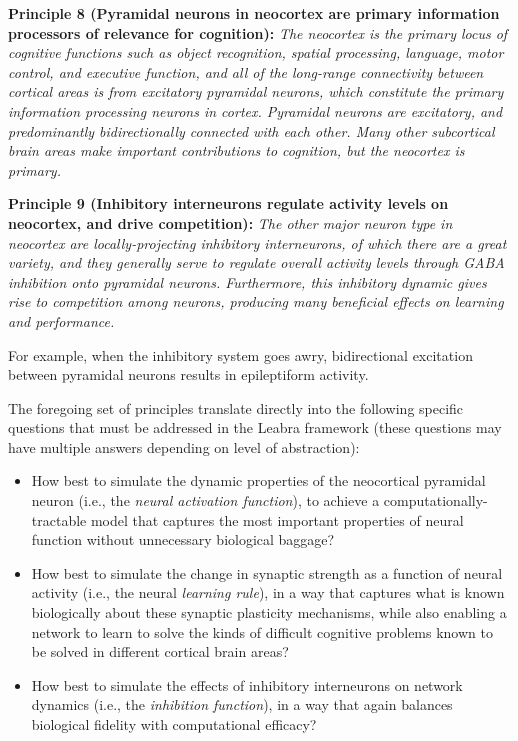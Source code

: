 \documentclass[11pt,twoside]{article}
\begin{document}
{\bf Principle 8 (Pyramidal neurons in neocortex are primary information processors of relevance for cognition):} {\em The neocortex is the primary locus of cognitive functions such as object recognition, spatial processing, language, motor control, and executive function, and all of the long-range connectivity between cortical areas is from excitatory pyramidal neurons, which constitute the primary information processing neurons in cortex.  Pyramidal neurons are excitatory, and predominantly bidirectionally connected with each other.  Many other subcortical brain areas make important contributions to cognition, but the neocortex is primary.}

{\bf Principle 9 (Inhibitory interneurons regulate activity levels on neocortex, and drive competition):} {\em The other major neuron type in neocortex are locally-projecting inhibitory interneurons, of which there are a great variety, and they generally serve to regulate overall activity levels through GABA inhibition onto pyramidal neurons.  Furthermore, this inhibitory dynamic gives rise to competition among neurons, producing many beneficial effects on learning and performance.}

For example, when the inhibitory system goes awry, bidirectional excitation between pyramidal neurons results in epileptiform activity.

The foregoing set of principles translate directly into the following specific questions that must be addressed in the Leabra framework (these questions may have multiple answers depending on level of abstraction):
\begin{itemize}
\item How best to simulate the dynamic properties of the neocortical pyramidal neuron (i.e., the {\em neural activation function}), to achieve a computationally-tractable model that captures the most important properties of neural function without unnecessary biological baggage? 
\item How best to simulate the change in synaptic strength as a function of neural activity (i.e., the neural {\em learning rule}), in a way that captures what is known biologically about these synaptic plasticity mechanisms, while also enabling a network to learn to solve the kinds of difficult cognitive problems known to be solved in different cortical brain areas?
\item How best to simulate the effects of inhibitory interneurons on network dynamics (i.e., the {\em inhibition function}), in a way that again balances biological fidelity with computational efficacy?
\end{itemize}
\end{document}
